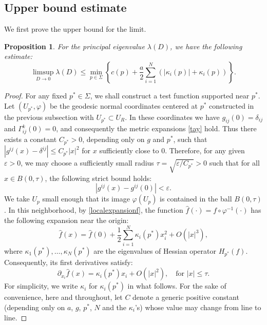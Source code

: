 \documentclass[12pt,reqno]{amsart}
\newtheorem{proposition}{Proposition}[section]
\numberwithin{equation}{section}
\begin{document}
\subsection{Upper bound estimate}
We first prove the upper bound for the limit.
\begin{proposition}\label{prop:upper} 
For the principal eigenvalue $\lambda(D)$, we have the following estimate:
\[
\limsup_{D \to 0} \lambda(D) \leq \min_{p \in \Sigma} \left\{ c(p) + \frac{a}{2} \sum_{i=1}^N \left( |\kappa_i(p)| + \kappa_i(p) \right) \right\}.
\]
\end{proposition}
\begin{proof}
For any fixed \(p^*\in\Sigma\), we shall construct a test function supported near \(p^*\). Let \((U_{p^*},\varphi)\) be the geodesic normal coordinates centered at \({p^*}\) constructed in the previous subsection with $U_{p^*}\subset U_R$. In these coordinates we have \(g_{ij}(0)=\delta_{ij}\) and \(\Gamma_{ij}^k(0)=0\), and consequently the metric expansions \eqref{tay} hold.
Thus there exists a constant $C_{p^*} > 0$, depending only on $g$ and $p^*$, such that $|g^{ij}(x) - \delta^{ij}| \le C_{p^*}|x|^2$ for $x$ sufficiently close to $0$. Therefore, for any given $\varepsilon> 0$, we may choose a sufficiently small radius $\tau = \sqrt{\varepsilon / C_{p^*}} > 0$ such that for all $x \in B(0, \tau)$, the following strict bound holds:
\[
|g^{ij}(x) - g^{ij}(0)| < \varepsilon.
\]
We take $U_p$ small enough that its image $\varphi(U_p)$ is contained in the ball $B(0, \tau)$. In this neighborhood, by \eqref{localexpansionf}, the function $\hat{f}(\cdot)=f\circ \varphi^{-1}(\cdot)$ has the following expansion near the origin:
\[
\hat{f}(x) = \hat{f}(0) + \frac{1}{2} \sum_{i=1}^N \kappa_i({p^*}) x_i^2 + O(|x|^3),
\]
where $\kappa_1({p^*}), \ldots, \kappa_N({p^*})$ are the eigenvalues of Hessian operator $H_{p^*}(f)$. Consequently, its first derivatives satisfy:
\begin{equation}\label{tayf}
\partial_{x_i}\hat{f}(x) = \kappa_i({p^*}) x_i + O(|x|^2), \quad \text{for } |x| \leq \tau.
\end{equation}
For simplicity, we write $\kappa_i$ for $\kappa_i({p^*})$ in what follows. For the sake of convenience, here and throughout, let $C$ denote a generic positive constant (depending only on $a$, $g$, ${p^*}$, $N$ and the $\kappa_i$'s) whose value may change from line to line.




\end{proof}
\end{document}

